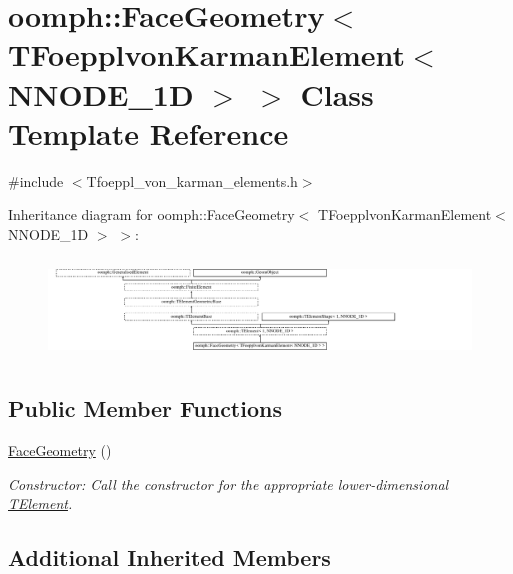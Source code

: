 \hypertarget{classoomph_1_1FaceGeometry_3_01TFoepplvonKarmanElement_3_01NNODE__1D_01_4_01_4}{}\section{oomph\+:\+:Face\+Geometry$<$ T\+Foepplvon\+Karman\+Element$<$ N\+N\+O\+D\+E\+\_\+1D $>$ $>$ Class Template Reference}
\label{classoomph_1_1FaceGeometry_3_01TFoepplvonKarmanElement_3_01NNODE__1D_01_4_01_4}


{\ttfamily \#include $<$Tfoeppl\+\_\+von\+\_\+karman\+\_\+elements.\+h$>$}

Inheritance diagram for oomph\+:\+:Face\+Geometry$<$ T\+Foepplvon\+Karman\+Element$<$ N\+N\+O\+D\+E\+\_\+1D $>$ $>$\+:\begin{figure}[H]
\begin{center}
\leavevmode
\includegraphics[height=2.692308cm]{classoomph_1_1FaceGeometry_3_01TFoepplvonKarmanElement_3_01NNODE__1D_01_4_01_4}
\end{center}
\end{figure}
\subsection*{Public Member Functions}
\begin{DoxyCompactItemize}
\item 
\hyperlink{classoomph_1_1FaceGeometry_3_01TFoepplvonKarmanElement_3_01NNODE__1D_01_4_01_4_a6105f671ea381b92e06f2ae67118d04b}{Face\+Geometry} ()
\begin{DoxyCompactList}\small\item\em Constructor\+: Call the constructor for the appropriate lower-\/dimensional \hyperlink{classoomph_1_1TElement}{T\+Element}. \end{DoxyCompactList}\end{DoxyCompactItemize}
\subsection*{Additional Inherited Members}


